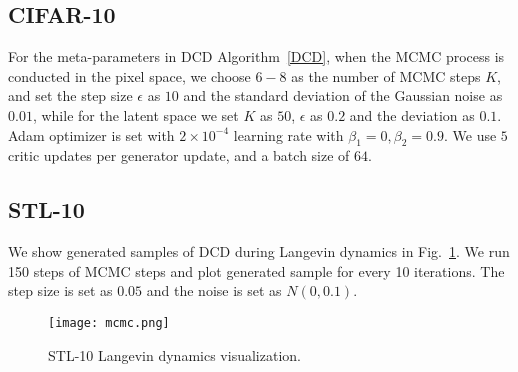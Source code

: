 \documentclass{article}
\begin{document}
\subsection{CIFAR-10}
For the meta-parameters in DCD Algorithm~\ref{DCD}, when the MCMC process is conducted in the pixel space, we choose $6-8$ as the number of MCMC steps $K$, and set the step size $\epsilon$ as $10$ and the standard deviation of the Gaussian noise as $0.01$, while for the latent space we set $K$ as $50$, $\epsilon$ as $0.2$ and the deviation as $0.1$. Adam optimizer \cite{kingma2014adam} is set with $2\times 10^{-4}$ learning rate with $\beta_1=0,\beta_2=0.9$. We use $5$ critic updates per generator update, and a batch size of $64$.

\subsection{STL-10}
We show generated samples of DCD during Langevin dynamics in Fig.~\ref{app:fig:stl}. We run 150 steps of MCMC steps
and plot generated sample for every 10 iterations. The step size is set as $0.05$ and the noise is set as $N(0,0.1)$.

\begin{figure}[!h]
    \centering
    \texttt{[image: mcmc.png]}
    \caption{STL-10 Langevin dynamics visualization.}
    \label{app:fig:stl}
\end{figure}
 
\end{document}
